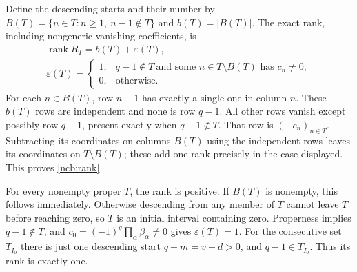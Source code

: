 Define the descending starts and their number by
$B(T)=\{n\in T:n\geq1,\ n-1\notin T\}$ and $b(T)=|B(T)|$.
The exact rank, including nongeneric vanishing coefficients, is
\begin{equation}\tag{NCB32}\label{ncb:rank}
\begin{gathered}
\operatorname{rank}R_T=b(T)+\varepsilon(T),\\
\varepsilon(T)=
\begin{cases}
1,&q-1\notin T\ \text{and some }n\in T\setminus B(T)
                                    \text{ has }c_n\ne0,\\
0,&\text{otherwise}.
\end{cases}
\end{gathered}
\end{equation}
For each $n\in B(T)$, row $n-1$ has exactly a single one in column
$n$. These $b(T)$ rows are independent and none is row $q-1$.
All other rows vanish except possibly row $q-1$, present exactly when
$q-1\notin T$. That row is $(-c_n)_{n\in T}$.
Subtracting its coordinates on columns $B(T)$ using the independent
rows leaves its coordinates on $T\setminus B(T)$; these add one rank
precisely in the case displayed. This proves \eqref{ncb:rank}.

For every nonempty proper $T$, the rank is positive. If $B(T)$ is
nonempty, this follows immediately. Otherwise descending from any
member of $T$ cannot leave $T$ before reaching zero, so $T$ is an
initial interval containing zero. Properness implies $q-1\notin T$,
and $c_0=(-1)^q\prod_\alpha\beta_\alpha\ne0$ gives
$\varepsilon(T)=1$. For the consecutive set $T_{I_0}$ there is just
one descending start $q-m=v+d>0$, and $q-1\in T_{I_0}$.
Thus its rank is exactly one.

